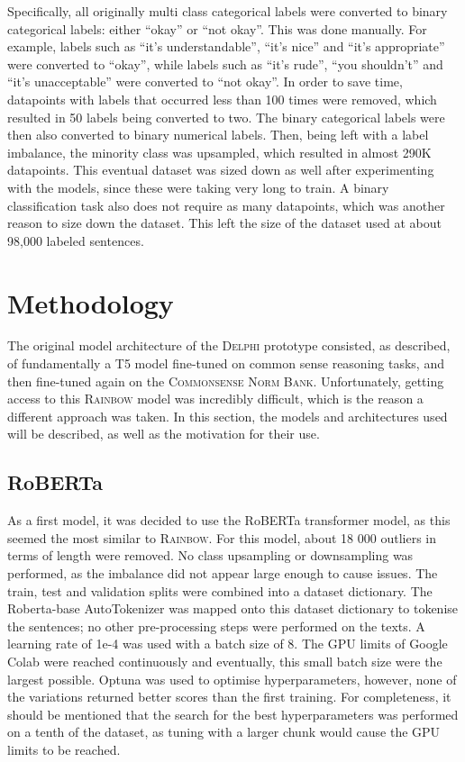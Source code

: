 \documentclass[final]{clv3} %
\begin{document}
Specifically, all originally multi class categorical labels were converted to binary categorical labels: either “okay” or “not okay”. This was done manually. For example, labels such as “it’s understandable”, “it’s nice” and “it’s appropriate” were converted to “okay”, while labels such as “it’s rude”, “you shouldn’t” and “it’s unacceptable” were converted to “not okay”. In order to save time, datapoints with labels that occurred less than 100 times were removed, which resulted in 50 labels being converted to two. The binary categorical labels were then also converted to binary numerical labels. Then, being left with a label imbalance, the minority class was upsampled, which resulted in almost 290K datapoints. This eventual dataset was sized down as well after experimenting with the models, since these were taking very long to train. A binary classification task also does not require as many datapoints, which was another reason to size down the dataset. This left the size of the dataset used at about 98,000 labeled sentences.

\section{Methodology}

The original model architecture of the \textsc{Delphi} prototype consisted, as described, of fundamentally a T5 model fine-tuned on common sense reasoning tasks, and then fine-tuned again on the \textsc{Commonsense Norm Bank}. Unfortunately, getting access to this \textsc{Rainbow} \cite{lourie} model was incredibly difficult, which is the reason a different approach was taken. In this section, the models and architectures used will be described, as well as the motivation for their use. \\

\subsection{RoBERTa}

As a first model, it was decided to use the RoBERTa transformer model, as this seemed the most similar to \textsc{Rainbow}. For this model, about 18 000 outliers in terms of length were removed. No class upsampling or downsampling was performed, as the imbalance did not appear large enough to cause issues. The train, test and validation splits were combined into a dataset dictionary. The Roberta-base AutoTokenizer was mapped onto this dataset dictionary to tokenise the sentences; no other pre-processing steps were performed on the texts. A learning rate of 1e-4 was used with a batch size of 8. The GPU limits of Google Colab were reached continuously and eventually, this small batch size were the largest possible. Optuna \cite{akiba} was used to optimise hyperparameters, however, none of the variations returned better scores than the first training. For completeness, it should be mentioned that the search for the best hyperparameters was performed on a tenth of the dataset, as tuning with a larger chunk would cause the GPU limits to be reached.
\end{document}
